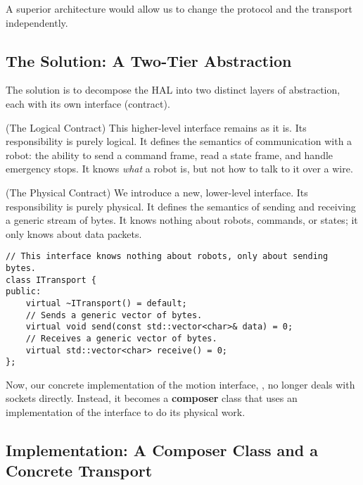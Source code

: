A superior architecture would allow us to change the protocol and the transport independently.

\subsection{The Solution: A Two-Tier Abstraction}
\label{subsec:two_tier_solution}

The solution is to decompose the HAL into two distinct layers of abstraction, each with its own interface (contract).

\begin{description}
    \item {} (The Logical Contract) This higher-level interface remains as it is. Its responsibility is purely logical. It defines the semantics of communication with a robot: the ability to send a command frame, read a state frame, and handle emergency stops. It knows \textit{what} a robot is, but not how to talk to it over a wire.
    
    \item {} (The Physical Contract)  We introduce a new, lower-level interface. Its responsibility is purely physical. It defines the semantics of sending and receiving a generic stream of bytes. It knows nothing about robots, commands, or states; it only knows about data packets.
\end{description}

\begin{verbatim}
// This interface knows nothing about robots, only about sending bytes.
class ITransport {
public:
    virtual ~ITransport() = default;
    // Sends a generic vector of bytes.
    virtual void send(const std::vector<char>& data) = 0;
    // Receives a generic vector of bytes.
    virtual std::vector<char> receive() = 0;
};
\end{verbatim}
\label{lst:itransport-interface}

Now, our concrete implementation of the motion interface, , no longer deals with sockets directly. Instead, it becomes a \textbf{composer} class that uses an implementation of the  interface to do its physical work.


\subsection{Implementation: A Composer Class and a Concrete Transport}
\label{subsec:two_tier_implementation}

